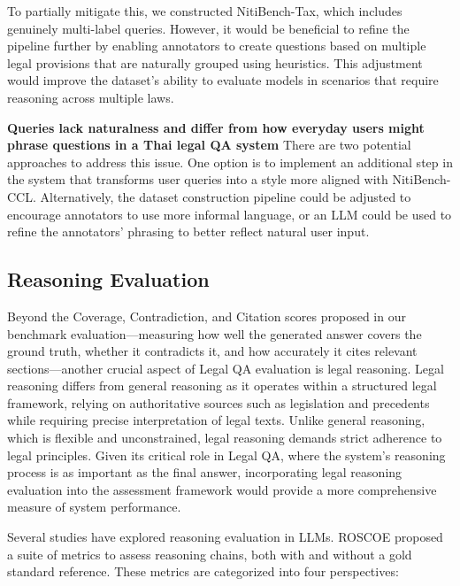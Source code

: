 To partially mitigate this, we constructed NitiBench-Tax, which includes genuinely multi-label queries.
%
However, it would be beneficial to refine the pipeline further by enabling annotators to create questions based on multiple legal provisions that are naturally grouped using heuristics. 
%
This adjustment would improve the dataset's ability to evaluate models in scenarios that require reasoning across multiple laws.

\textbf{Queries lack naturalness and differ from how everyday users might phrase questions in a Thai legal QA system} 
%
There are two potential approaches to address this issue.
%
One option is to implement an additional step in the system that transforms user queries into a style more aligned with NitiBench-CCL. 
%
Alternatively, the dataset construction pipeline could be adjusted to encourage annotators to use more informal language, or an LLM could be used to refine the annotators' phrasing to better reflect natural user input.

\subsection{Reasoning Evaluation}
\label{subsec: reasoning_evaluation}

Beyond the Coverage, Contradiction, and Citation scores proposed in our benchmark evaluation—measuring how well the generated answer covers the ground truth, whether it contradicts it, and how accurately it cites relevant sections—another crucial aspect of Legal QA evaluation is legal reasoning. 
%
Legal reasoning differs from general reasoning as it operates within a structured legal framework, relying on authoritative sources such as legislation and precedents while requiring precise interpretation of legal texts.
%
Unlike general reasoning, which is flexible and unconstrained, legal reasoning demands strict adherence to legal principles. 
%
Given its critical role in Legal QA, where the system's reasoning process is as important as the final answer, incorporating legal reasoning evaluation into the assessment framework would provide a more comprehensive measure of system performance.

Several studies have explored reasoning evaluation in LLMs.
%
ROSCOE \cite{roscoe} proposed a suite of metrics to assess reasoning chains, both with and without a gold standard reference. 
%
These metrics are categorized into four perspectives:

